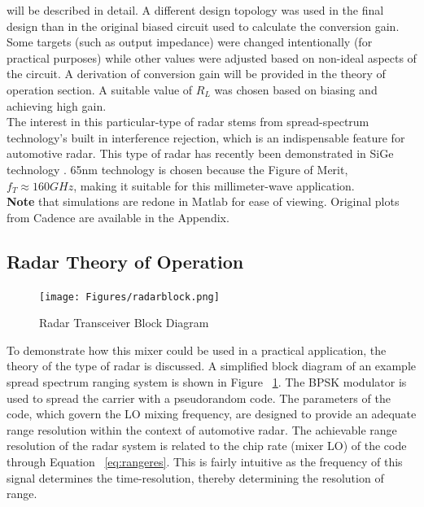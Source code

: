 \documentclass{article}                                                         %
\begin{document}
will be described in detail. A different design topology was used in the final design than in the original biased circuit used to calculate
the conversion gain. Some targets (such as output impedance) were changed intentionally (for practical purposes) while other values
were adjusted based on non-ideal aspects of the circuit.\vspace{3mm}
A derivation of conversion gain will be provided in the theory of operation section. A suitable value of $R_L$ was chosen
based on biasing and achieving high gain.\\
The interest in this particular-type of radar stems from spread-spectrum technology's built in interference rejection, which
is an indispensable feature for automotive radar. This type of radar has recently been demonstrated in
SiGe technology \cite{trotta200779ghz, ng2014fully}. 65nm technology is chosen because the Figure of Merit, $f_T \approx 160GHz $, making it suitable for
this millimeter-wave application.\\

\textbf{Note} that simulations are redone in Matlab for ease of viewing. Original plots from Cadence are available in the Appendix.

\newpage
\subsection{Radar Theory of Operation}

\begin{figure}
  \begin{center}
    \texttt{[image: Figures/radarblock.png]}
    \caption{Radar Transceiver Block Diagram}
    \label{fig:radartrans}
  \end{center}
\end{figure}
To demonstrate how this mixer could be used in a practical application, the theory of the type of radar is discussed.
A simplified block diagram of an example spread spectrum ranging system is shown in Figure ~\ref{fig:radartrans}.
The BPSK modulator is used to spread the carrier with a pseudorandom code. The parameters of the code, which govern
the LO mixing frequency, are designed to provide an adequate range resolution within the context of automotive radar.
The achievable range resolution of the radar system is related to the chip rate (mixer LO) of the code through
Equation ~\ref{eq:rangeres}. This is fairly intuitive as the frequency of this signal determines the time-resolution,
thereby determining the resolution of range. \\
\end{document}
